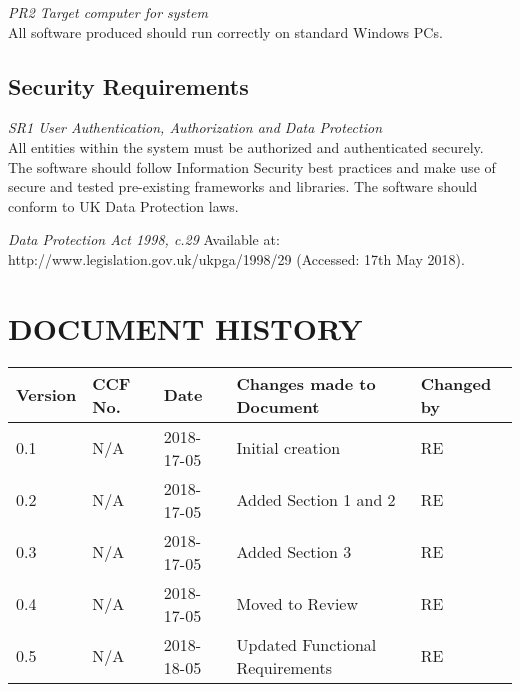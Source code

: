 \documentclass{project}
\begin{document}
\textit{PR2 Target computer for system}\\
All software produced should run correctly on standard Windows PCs.\\

\newpage

\subsection{Security Requirements}
\textit{SR1 User Authentication, Authorization and Data Protection}\\
All entities within the system must be authorized and authenticated securely. The software should follow Information Security best practices and make use of secure and tested pre-existing frameworks and libraries. The software should conform to UK Data Protection laws. \cite{dpa98}\\

\clearpage
{}
\begin{thebibliography}{5}
	 \emph{Data Protection Act 1998, c.29}
	Available at: http://www.legislation.gov.uk/ukpga/1998/29 (Accessed: 17th May 2018).
\end{thebibliography}

\clearpage
{}
\section*{DOCUMENT HISTORY}
\begin{tabular}{|l | l | l | l | l |}
	\hline
	Version & CCF No. & Date & Changes made to Document & Changed by \\
	\hline
	0.1 & N/A & 2018-17-05 & Initial creation & RE \\
	0.2 & N/A & 2018-17-05 & Added Section 1 and 2 & RE \\
	0.3 & N/A & 2018-17-05 & Added Section 3 & RE \\
	0.4 & N/A & 2018-17-05 & Moved to Review & RE \\
	0.5 & N/A & 2018-18-05 & Updated Functional Requirements & RE \\
	
	\hline
\end{tabular}
\label{thelastpage}
\end{document}

